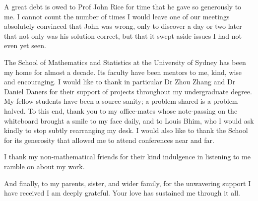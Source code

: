 A great debt is owed to Prof John Rice for time that he gave so generously to me. I cannot count the number of times I would leave one of our meetings absolutely convinced that John was wrong, only to discover a day or two later that not only was his solution correct, but that it swept aside issues I had not even yet seen.

The School of Mathematics and Statistics at the University of Sydney has been my home for almost a decade. Its faculty have been mentors to me, kind, wise and encouraging. I would like to thank in particular Dr Zhou Zhang and Dr Daniel Daners for their support of projects throughout my undergraduate degree.
My fellow students have been a source sanity; a problem shared is a problem halved.
To this end, thank you to my office-mates whose note-passing on the whiteboard brought a smile to my face daily, and to Louis Bhim, who I would ask kindly to stop subtly rearranging my desk.
I would also like to thank the School for its generosity that allowed me to attend conferences near and far.

I thank my non-mathematical friends for their kind indulgence in listening to me ramble on about my work.

And finally, to my parents, sister, and wider family, for the unwavering support I have received I am deeply grateful. Your love has sustained me through it all.
